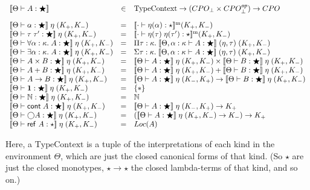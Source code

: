 \begin{displaymath}
\begin{array}{lcl}\interp{\judgeWK{A}{\bigstar}} &\in& \mathrm{Type Context} \to (CPO_\bot \times CPO^{op}_\bot) \to CPO 
\\[1em]
\interp{\judgeWK{\alpha}{\bigstar}}\;\eta\;(K_+,K_-) & = & 
    \interpmono{\judgeWK[\cdot]{\eta(\alpha)}{\star}}(K_+, K_-) 
\\
\interp{\judgeWK{\tau\;\tau'}{\bigstar}}\;\eta\;(K_+,K_-) & = & 
    \interpmono{\judgeWK[\cdot]{\eta(\tau)\;\eta(\tau')}{\star}}(K_+, K_-) 
\\
\interp{\judgeWK{\forall \alpha:\kappa.\;A}{\bigstar}}\;\eta\;(K_+,K_-) & = & 
    \Pi \tau:\kappa.\; 
        \interp{\judgeWK[\Theta, \alpha:\kappa]{A}{\bigstar}}\;(\eta,\tau)\;(K_+,K_-) 
\\
\interp{\judgeWK{\exists \alpha:\kappa.\;A}{\bigstar}}\;\eta\;(K_+,K_-) & = & 
    \Sigma \tau:\kappa.\; 
        \interp{\judgeWK[\Theta, \alpha:\kappa]{A}{\bigstar}}\;(\eta,\tau)\;(K_+,K_-) 
\\
\interp{\judgeWK{A \times B}{\bigstar}}\;\eta\;(K_+,K_-) & = & 
   \interp{\judgeWK{A}{\bigstar}}\;\eta\;(K_+,K_-) \times
   \interp{\judgeWK{B}{\bigstar}}\;\eta\;(K_+,K_-) 
\\
\interp{\judgeWK{A + B}{\bigstar}}\;\eta\;(K_+,K_-) & = & 
   \interp{\judgeWK{A}{\bigstar}}\;\eta\;(K_+,K_-) +
   \interp{\judgeWK{B}{\bigstar}}\;\eta\;(K_+,K_-) 
\\
\interp{\judgeWK{A \to B}{\bigstar}}\;\eta\;(K_+,K_-) & = & 
   \interp{\judgeWK{A}{\bigstar}}\;\eta\;(K_-,K_+) \to
   \interp{\judgeWK{B}{\bigstar}}\;\eta\;(K_+,K_-) 
\\
\interp{\judgeWK{\unittype}{\bigstar}}\;\eta\;(K_+, K_-) & = & \setof{*} 
\\

\interp{\judgeWK{\N}{\bigstar}}\;\eta\;(K_+, K_-) & = &  \N 
\\
\interp{\judgeWK{\cont{A}}{\bigstar}}\;\eta\;(K_+,K_-) & = & 
   \interp{\judgeWK{A}{\bigstar}}\;\eta\;(K_-,K_+) \to K_+
\\
\interp{\judgeWK{\monad{A}}{\bigstar}}\;\eta\;(K_+,K_-) & = & 
   (\interp{\judgeWK{A}{\bigstar}}\;\eta\;(K_+,K_-) \to K_-) \to K_+
\\
\interp{\judgeWK{\reftype{A}}{\star}}\;\eta\;(K_+, K_-) & = & Loc(A) 
\\
\end{array}
\end{displaymath}

Here, a $\mbox{TypeContext}$ is a tuple of the interpretations of
each kind in the environment $\Theta$, which are just the closed 
canonical forms of that kind. (So $\star$ are just the closed 
monotypes, $\star \to \star$ the closed lambda-terms of that kind,
and so on.)

